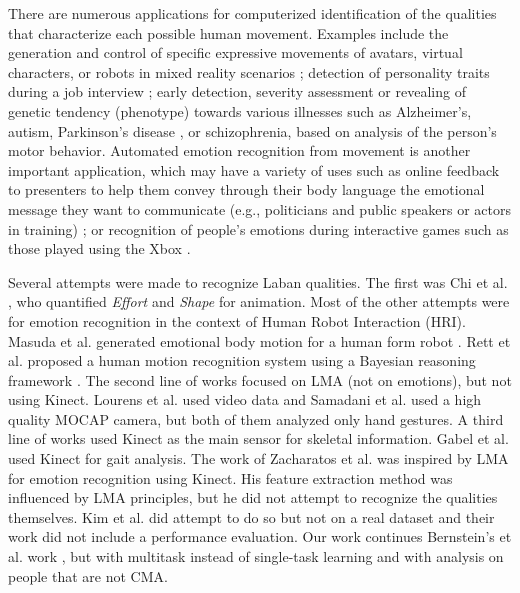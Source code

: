 \documentclass[11pt,twocolumn,varwidth=true,a4paper,fleqn]{article}
\begin{document}
\mbox{}
\par
There are numerous applications for computerized identification of the
qualities that characterize each possible human movement. Examples include the generation and control of specific expressive movements of avatars, virtual characters, or robots in mixed reality scenarios
\cite{Masuda}; detection of personality traits during a job interview
\cite{levy2003use}; early detection, severity assessment or revealing of genetic tendency (phenotype) towards various illnesses such as Alzheimer's,
autism, Parkinson's disease \cite{camurri2003application}, or schizophrenia,
based on analysis of the person's motor behavior. Automated emotion recognition from movement is another
important application, which may have a variety of uses such as online feedback
to presenters to help them convey through their body language the emotional message they want to communicate
(e.g., politicians and public speakers or actors in training) \cite{nguyen2012online}; or recognition
of people's emotions during interactive games such as those played using the Xbox \cite{Zacharatos}.
\mbox{}\\
\par
Several attempts were made to recognize Laban qualities. The first was Chi
et al. \cite{chi2000emote}, who quantified \textit{Effort} and \textit{Shape} for animation.
Most of the other attempts were for emotion recognition in the context of Human Robot Interaction (HRI).
Masuda et al. generated emotional body motion for a human form robot \cite{Masuda}.
Rett et al. proposed a human motion recognition system using a Bayesian reasoning framework \cite{Rett}.
The second line of works focused on LMA (not on emotions), but not using Kinect.
Lourens et al. \cite{lourens2010communicating} used video data and Samadani et al.
\cite{samadani2013laban} used a high quality MOCAP camera, but both of them
analyzed only hand gestures. A third line of works used Kinect as the main
sensor for skeletal information. Gabel et al. \cite{gabel2012full} used Kinect for gait analysis. The work of
Zacharatos et al. \cite{Zacharatos} was inspired by LMA for emotion recognition using Kinect. 
His feature extraction method was influenced by LMA principles, but he did not attempt to 
recognize the qualities themselves. Kim et al. \cite{kim} did attempt to do so but not on 
a real dataset and their work did not include a performance evaluation. Our work
continues Bernstein's et al. work \cite{ran}, but with multitask instead of
single-task learning and with analysis on people that are not CMA.
\end{document}
